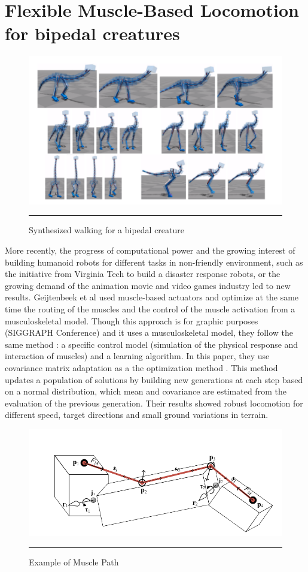 \section{Flexible Muscle-Based Locomotion for bipedal creatures}

\begin{figure}[htbp]
    \centering
    \includegraphics[scale=0.3]{Figures/synthesized_walking.png}
    \rule{35em}{0.5pt}
    \caption[Synthesized walking for a bipedial creature]{Synthesized walking for a bipedal creature}
    \label{fig:yamor}
\end{figure}

More recently, the progress of computational power and the growing interest of building humanoid robots for different tasks in non-friendly environment, such as the initiative from Virginia Tech to build a disaster response robots, or the growing demand of the animation movie and video games industry led to new results. Geijtenbeek et al \cite{MuscleBasedBipeds} used muscle-based actuators and optimize at the same time the routing of the muscles and the control of the muscle activation from a musculoskeletal model. Though this approach is for graphic purposes (SIGGRAPH Conference) and it uses a musculoskeletal model, they follow the same method : a specific control model (simulation of the physical response and interaction of muscles) and a learning algorithm. In this paper, they use covariance matrix adaptation as a the optimization method \cite{igel2007covariance}. This method updates a population of solutions by building new generations at each step based on a normal distribution, which mean and covariance are estimated from the evaluation of the previous generation. Their results showed robust locomotion for different speed, target directions and small ground variations in terrain.

\begin{figure}[htbp]
    \centering
    \includegraphics[scale=0.2]{Figures/muscle_based.png}
    \rule{35em}{0.5pt}
    \caption[Example of Muscle Path]{Example of Muscle Path}
    \label{fig:yamor}
\end{figure}


